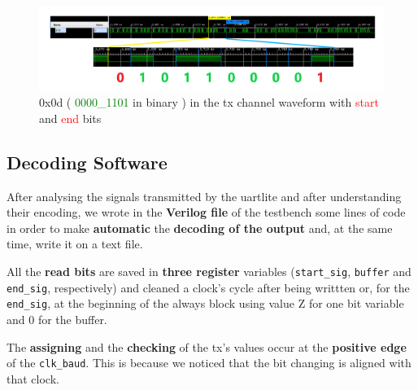 \begin{figure}[h]
  \includegraphics[width=\textwidth]{./../../img/Images/uart_tx_0x0d}
  \caption{ 0x0d ( \textcolor{Green}{0000\_1101} in binary ) in the tx channel waveform with \textcolor{Red}{start} and \textcolor{Red}{end} bits}
  \label{0x0d_waveform}
\end{figure}


{\color{Blue}\subsection{Decoding Software}}
After analysing the signals transmitted by the uartlite and after understanding their encoding, we wrote in the {\bf Verilog file} of the testbench some lines of code in order to make {\bf automatic} the {\bf decoding of the output} and, at the same time, write it on a text file.
\newline

All the {\bf read bits} are saved in {\bf three register} variables ({\verb+start_sig+}, {\verb+buffer+} and { \verb+end_sig+}, respectively) and cleaned a clock’s cycle after being writtten or, for the { \verb+end_sig+}, at the beginning of the always block using value Z for one bit variable and 0 for the buffer.
\newline

The {\bf assigning} and the {\bf checking} of the tx’s values occur at the {\bf positive edge} of the { \verb+clk_baud+}. This is because we noticed that the bit changing is aligned with that clock.
\newline
